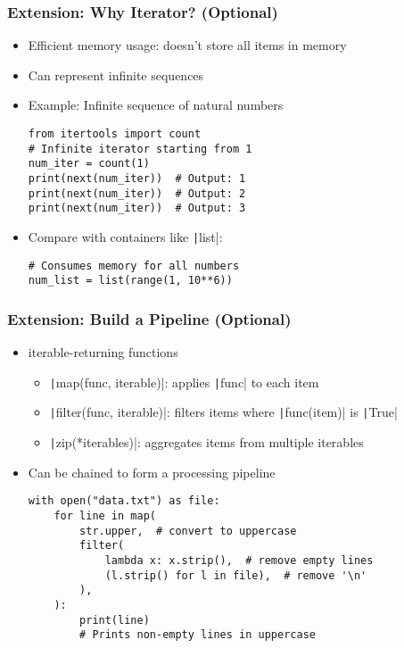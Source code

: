 \documentclass{beamer}
\begin{document}
\begin{frame}[fragile]
    \frametitle{Extension: Why Iterator? (Optional)}
    \begin{itemize}
        \item Efficient memory usage: doesn't store all items in memory
        \item Can represent infinite sequences
        \item Example: Infinite sequence of natural numbers
              \begin{verbatim}
from itertools import count
# Infinite iterator starting from 1
num_iter = count(1)
print(next(num_iter))  # Output: 1
print(next(num_iter))  # Output: 2
print(next(num_iter))  # Output: 3
              \end{verbatim}
        \item Compare with containers like \texttt|list|:
              \begin{verbatim}
# Consumes memory for all numbers
num_list = list(range(1, 10**6))
              \end{verbatim}
    \end{itemize}
\end{frame}

\begin{frame}[fragile]
    \frametitle{Extension: Build a Pipeline (Optional)}
    \begin{itemize}
        \item iterable-returning functions
              \begin{itemize}
                  \item \texttt|map(func, iterable)|: applies \texttt|func| to each item
                  \item \texttt|filter(func, iterable)|: filters items where \texttt|func(item)| is \texttt|True|
                  \item \texttt|zip(*iterables)|: aggregates items from multiple iterables
              \end{itemize}
        \item Can be chained to form a processing pipeline
              \begin{verbatim}
with open("data.txt") as file:
    for line in map(
        str.upper,  # convert to uppercase
        filter(
            lambda x: x.strip(),  # remove empty lines
            (l.strip() for l in file),  # remove '\n'
        ),
    ):
        print(line)
        # Prints non-empty lines in uppercase

              \end{verbatim}
    \end{itemize}
\end{frame}
\end{document}

